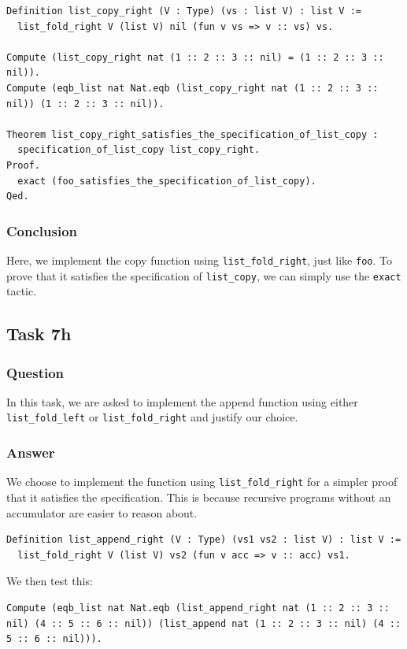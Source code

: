 \documentclass{article}
\begin{document}
\begin{lstlisting}
Definition list_copy_right (V : Type) (vs : list V) : list V :=
  list_fold_right V (list V) nil (fun v vs => v :: vs) vs.

Compute (list_copy_right nat (1 :: 2 :: 3 :: nil) = (1 :: 2 :: 3 :: nil)).
Compute (eqb_list nat Nat.eqb (list_copy_right nat (1 :: 2 :: 3 :: nil)) (1 :: 2 :: 3 :: nil)).

Theorem list_copy_right_satisfies_the_specification_of_list_copy :
  specification_of_list_copy list_copy_right.
Proof.
  exact (foo_satisfies_the_specification_of_list_copy).
Qed.
\end{lstlisting}

\subsubsection{Conclusion}
Here, we implement the copy function using \texttt{list\_fold\_right}, just like \texttt{foo}. To prove that it satisfies the specification of \texttt{list\_copy}, we can simply use the \texttt{exact} tactic.

\subsection{Task 7h}

\subsubsection{Question}
In this task, we are asked to implement the append function using either \texttt{list\_fold\_left} or \texttt{list\_fold\_right} and justify our choice.

\subsubsection{Answer}
We choose to implement the function using \texttt{list\_fold\_right} for a simpler proof that it satisfies the specification. This is because recursive programs without an accumulator are easier to reason about. 

\begin{lstlisting}
Definition list_append_right (V : Type) (vs1 vs2 : list V) : list V :=
  list_fold_right V (list V) vs2 (fun v acc => v :: acc) vs1.
\end{lstlisting}

We then test this:

\begin{lstlisting}
Compute (eqb_list nat Nat.eqb (list_append_right nat (1 :: 2 :: 3 :: nil) (4 :: 5 :: 6 :: nil)) (list_append nat (1 :: 2 :: 3 :: nil) (4 :: 5 :: 6 :: nil))).
\end{lstlisting}
\end{document}
